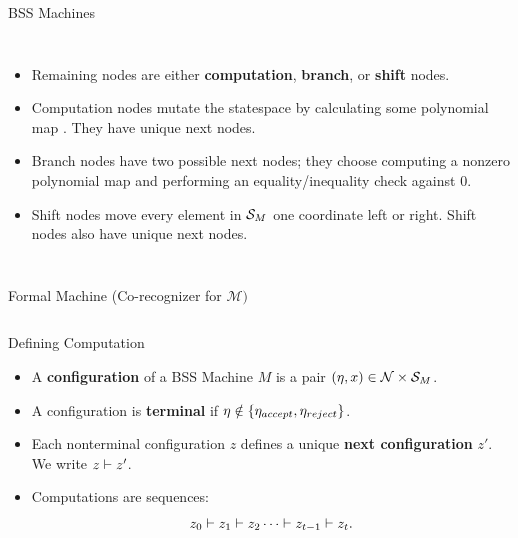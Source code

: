 \documentclass[c]{beamer}
\begin{document}
\begin{frame}{BSS Machines}
  
  \begin{columns}
    
    \begin{itemize}
    \item Remaining nodes are either \textbf{computation},
      \textbf{branch}, or \textbf{shift} nodes.
    \item Computation nodes mutate the statespace by calculating some
      polynomial map . They have unique next
      nodes.
    \item Branch nodes have two possible next nodes; they choose computing
      a nonzero polynomial map  and performing
      an equality/inequality check against $0$.
    \item Shift nodes move every element in $\mathcal{S}_M$ one
      coordinate left or right.  Shift nodes also have unique next
      nodes.
    \end{itemize}
    \scaletopagewidth[.9]{\mandelrecpII{}}
    
  \end{columns}
  
 \end{frame}

\begin{frame}{Formal Machine (Co-recognizer for $\mathcal{M})$}
  
  \begin{columns}
    \begin{center}
      \scaletopagewidth[.9]{\mandlegend{}}
    \end{center}
    
    \begin{center}
      \scaletopagewidth[.9]{\mandelrecfull{}}
    \end{center}
  \end{columns}

\end{frame}

\begin{frame}{Defining Computation}

  \begin{itemize}
    \setlength{\itemsep}{3mm}
  \item[] A \textbf{configuration} of a BSS Machine $M$ is a pair
    $(\eta, x) \in \mathcal{N} \times \mathcal{S}_M$.
  \item[] A configuration is \textbf{terminal} if $\eta \notin
    \{\eta_{accept}, \eta_{reject}\}$.
  \item[] Each nonterminal configuration $z$ defines a unique \textbf{next
      configuration} $z'$.  We write $z \vdash z'$.
  \item[] Computations are sequences:
    $$z_0 \vdash z_1 \vdash z_2 \cdots \vdash z_{t-1} \vdash z_t.$$
  \end{itemize}
\end{frame}
\end{document}

